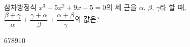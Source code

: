 삼차방정식 $x^3-5x^2+9x-5=0$의 세 근을 $\alpha$, $\beta$, $\gamma$라 할 때, $\dfrac{\beta+\gamma}{\alpha}+\dfrac{\gamma+\alpha}{\beta}+\dfrac{\alpha+\beta}{\gamma}$의 값은?
\begin{choices32}{$6$}{$7$}{$8$}{$9$}{$10$}\end{choices32}
